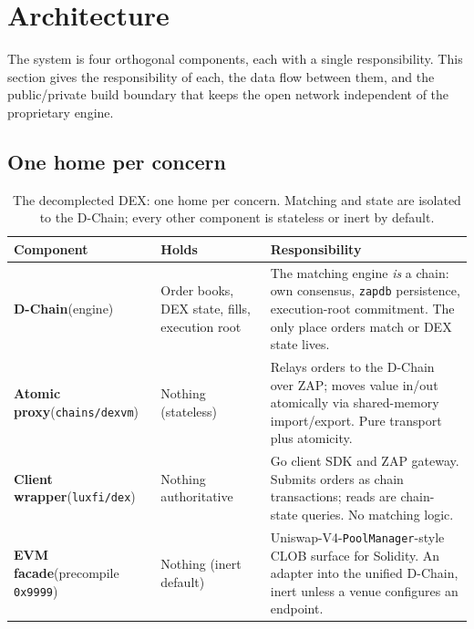 \section{Architecture}
\label{sec:architecture}

The system is four orthogonal components, each with a single responsibility. This
section gives the responsibility of each, the data flow between them, and the
public/private build boundary that keeps the open network independent of the
proprietary engine.

\subsection{One home per concern}

\begin{table}[H]
\centering
\renewcommand{\arraystretch}{1.3}
\begin{tabular}{p{3.0cm} p{3.2cm} p{6.2cm}}
\toprule
\textbf{Component} & \textbf{Holds} & \textbf{Responsibility} \\
\midrule
\textbf{D-Chain}\newline (engine) &
Order books, DEX state, fills, execution root &
The matching engine \emph{is} a chain: own consensus, \texttt{zapdb} persistence,
execution-root commitment. The only place orders match or DEX state lives. \\
\textbf{Atomic proxy}\newline (\texttt{chains/dexvm}) &
Nothing (stateless) &
Relays orders to the D-Chain over ZAP; moves value in/out atomically via
shared-memory import/export. Pure transport plus atomicity. \\
\textbf{Client wrapper}\newline (\texttt{luxfi/dex}) &
Nothing authoritative &
Go client SDK and ZAP gateway. Submits orders as chain transactions; reads are
chain-state queries. No matching logic. \\
\textbf{EVM facade}\newline (precompile \texttt{0x9999}) &
Nothing (inert default) &
Uniswap-V4-\texttt{PoolManager}-style CLOB surface for Solidity. An adapter into the
unified D-Chain, inert unless a venue configures an endpoint. \\
\bottomrule
\end{tabular}
\caption{The decomplected DEX: one home per concern. Matching and state are
isolated to the D-Chain; every other component is stateless or inert by default.}
\label{tab:homes}
\end{table}

